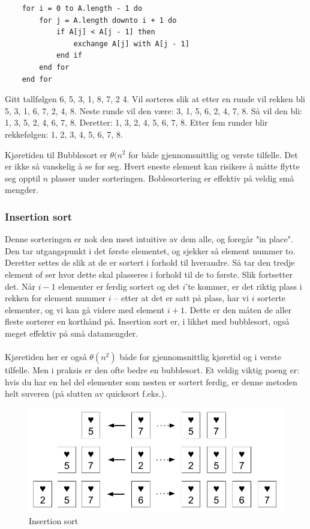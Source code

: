 \begin{lstlisting}
    for i = 0 to A.length - 1 do
    	for j = A.length downto i + 1 do
		    if A[j] < A[j - 1] then
		    	exchange A[j] with A[j - 1]
		    end if
	    end for
    end for
\end{lstlisting}

\begin{boxed}
Gitt tallfølgen 6, 5, 3, 1, 8, 7, 2 4. Vil sorteres slik at etter en runde vil rekken bli 5, 3, 1, 6, 7, 2, 4, 8. Neste runde vil den være: 3, 1, 5, 6, 2, 4, 7, 8. Så vil den bli: 1, 3, 5, 2, 4, 6, 7, 8. Deretter: 1, 3, 2, 4, 5, 6, 7, 8. Etter fem runder blir rekkefølgen: 1, 2, 3, 4, 5, 6, 7, 8.
\end{boxed}

\noindent Kjøretiden til Bubblesort er \textbf{$\theta(n^2$} for både gjennomsnittlig og verste tilfelle. Det er ikke så vanskelig å se for seg. Hvert eneste element kan risikere å måtte flytte seg opptil $n$ plasser under sorteringen. Boblesortering er effektiv på veldig små mengder.\\

\subsubsection{Insertion sort}
Denne sorteringen er nok den mest intuitive av dem alle, og foregår "in place". Den tar utgangspunkt i det første elementet, og sjekker så element nummer to. Deretter settes de slik at de er sortert i forhold til hverandre. Så tar den tredje element of ser hvor dette skal plasseres i forhold til de to første. Slik fortsetter det. Når $i - 1$ elementer er ferdig sortert og det $i$'te kommer, er det riktig plass i rekken for element nummer $i$ – etter at det er satt på plass, har vi $i$ sorterte elementer, og vi kan gå videre med element $i + 1$. Dette er den måten de aller fleste sorterer en korthånd på. Insertion sort er, i likhet med bubblesort, også meget effektiv på små datamengder. 
\\\\
Kjøretiden her er også \textbf{$\theta(n^2)$} både for gjennomsnittlig kjøretid og i verste tilfelle. Men i praksis er den ofte bedre en bubblesort. Et veldig viktig poeng er: hvis du har en hel del elementer som nesten er sortert ferdig, er denne metoden helt suveren (på slutten av quicksort f.eks.). 

\begin{figure}[H]
\includegraphics[scale=0.5]{images/insertionsort}
\centering %
\caption{Insertion sort}
\label{fig:insertionsort}
\end{figure}

